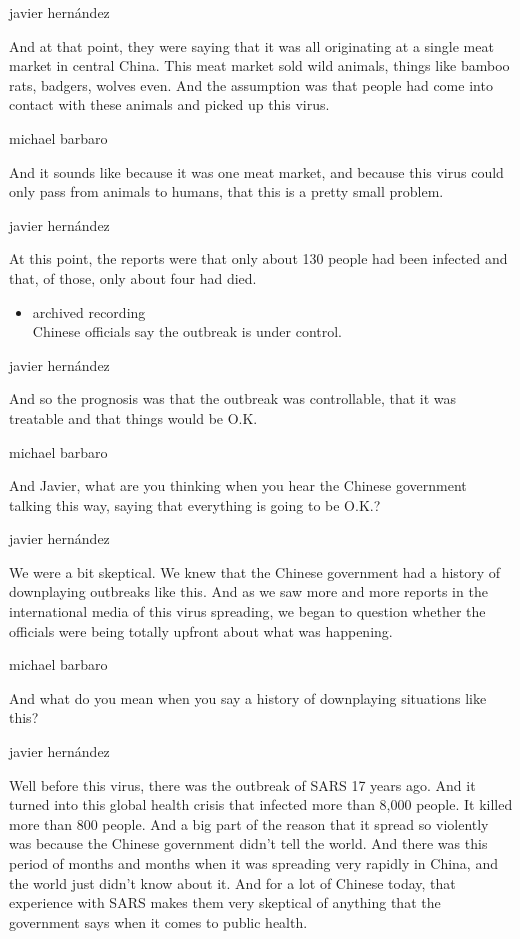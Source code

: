 javier hernández

And at that point, they were saying that it was all originating at a
single meat market in central China. This meat market sold wild animals,
things like bamboo rats, badgers, wolves even. And the assumption was
that people had come into contact with these animals and picked up this
virus.

michael barbaro

And it sounds like because it was one meat market, and because this
virus could only pass from animals to humans, that this is a pretty
small problem.

javier hernández

At this point, the reports were that only about 130 people had been
infected and that, of those, only about four had died.

\begin{itemize}
\tightlist
\item
  archived recording\\
  Chinese officials say the outbreak is under control.
\end{itemize}

javier hernández

And so the prognosis was that the outbreak was controllable, that it was
treatable and that things would be O.K.

michael barbaro

And Javier, what are you thinking when you hear the Chinese government
talking this way, saying that everything is going to be O.K.?

javier hernández

We were a bit skeptical. We knew that the Chinese government had a
history of downplaying outbreaks like this. And as we saw more and more
reports in the international media of this virus spreading, we began to
question whether the officials were being totally upfront about what was
happening.

michael barbaro

And what do you mean when you say a history of downplaying situations
like this?

javier hernández

Well before this virus, there was the outbreak of SARS 17 years ago. And
it turned into this global health crisis that infected more than 8,000
people. It killed more than 800 people. And a big part of the reason
that it spread so violently was because the Chinese government didn't
tell the world. And there was this period of months and months when it
was spreading very rapidly in China, and the world just didn't know
about it. And for a lot of Chinese today, that experience with SARS
makes them very skeptical of anything that the government says when it
comes to public health.

